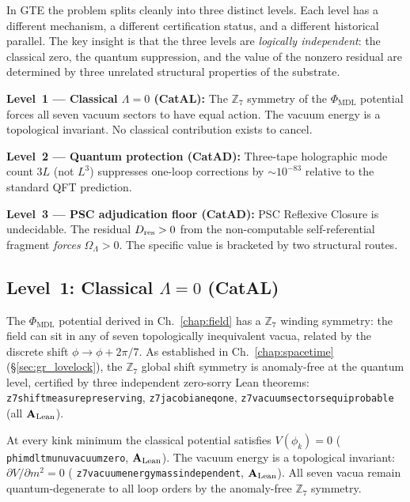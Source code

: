 \documentclass[11pt,openany]{book}
\theoremstyle{remark}
\newcommand{\PHIMDL}{\Phi_{\mathrm{MDL}}}
\newcommand{\ZS}{\mathbb{Z}_7}
\newcommand{\lean}[1]{%
  \penalty-100
  \begingroup\def\_{\textunderscore\allowbreak}\texttt{#1}\endgroup}
\newcommand{\OmL}{\Omega_\Lambda}
\newcommand{\Dres}{D_{\rm res}}
\newcommand{\CatAL}{\ensuremath{\textbf{A}_{\rm Lean}}}
\begin{document}
In GTE the problem splits cleanly into three distinct levels.
Each level has a different mechanism, a different certification status, and
a different historical parallel.
The key insight is that the three levels are \emph{logically independent}:
the classical zero, the quantum suppression, and the value of the
nonzero residual are determined by three unrelated structural properties of the substrate.

\begin{tcolorbox}[colback=green!5,colframe=green!50!black,
  title={Three-Level Architecture: The CC Problem in GTE}]
\textbf{Level~1 --- Classical $\Lambda = 0$ (CatAL):}
The $\mathbb{Z}_7$ symmetry of the $\PHIMDL$ potential forces all seven vacuum
sectors to have equal action.  The vacuum energy is a topological invariant.
No classical contribution exists to cancel.

\smallskip
\textbf{Level~2 --- Quantum protection (CatAD):}
Three-tape holographic mode count $3L$ (not $L^3$) suppresses one-loop corrections
by $\sim 10^{-83}$ relative to the standard QFT prediction.

\smallskip
\textbf{Level~3 --- PSC adjudication floor (CatAD):}
PSC Reflexive Closure is undecidable.
The residual $\Dres > 0$ from the non-computable self-referential fragment
\emph{forces} $\OmL > 0$.
The specific value is bracketed by two structural routes.
\end{tcolorbox}

\subsection*{Level~1: Classical \texorpdfstring{$\Lambda = 0$}{Lambda = 0} (CatAL)}

The $\PHIMDL$ potential derived in Ch.~\ref{chap:field} has a $\mathbb{Z}_7$
winding symmetry: the field can sit in any of seven topologically inequivalent vacua,
related by the discrete shift $\phi \to \phi + 2\pi/7$.
As established in Ch.~\ref{chap:spacetime} (§\ref{sec:gr_lovelock}),
the $\ZS$ global shift symmetry is anomaly-free at the quantum level,
certified by three independent zero-sorry Lean theorems:
\lean{z7\_shift\_measure\_preserving}, \lean{z7\_jacobian\_eq\_one},
\lean{z7\_vacuum\_sectors\_equiprobable} (all \CatAL).

At every kink minimum the classical potential satisfies $V(\phi_k) = 0$
(\lean{phimdl\_tmunu\_vacuum\_zero}, \CatAL).
The vacuum energy is a topological invariant: $\partial V / \partial m^2 = 0$
(\lean{z7\_vacuum\_energy\_mass\_independent}, \CatAL).
All seven vacua remain quantum-degenerate to all loop orders by the anomaly-free
$\ZS$ symmetry.
\end{document}
